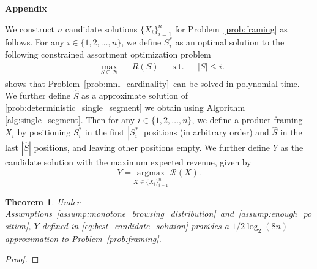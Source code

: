 \documentclass[msom,non-blindrev]{informs3} %
\newtheorem{theorem}{Theorem}
\theoremstyle{definition}
\begin{document}
\begin{appendices}{\Large \noindent\textbf{Appendix}}
{We construct $n$ candidate solutions $\{X_i\}_{i=1}^n$ for Problem~\eqref{prob:framing} as follows. For any $i\in\{1,2,\dots,n\}$, we define $S_i^*$ as an optimal solution to the following constrained assortment optimization problem
\begin{equation}
\label{prob:mnl_cardinality}
\begin{aligned}
&\max_{S\subseteq\mathcal{N}}&&R(S)&&\text{s.t.}&& |S|\leq i.
\end{aligned}
\end{equation}
\cite{rusmevichientong2010dynamic} shows that Problem~\eqref{prob:mnl_cardinality}~can be solved in polynomial time. We further define $\hat{S}$ as a approximate solution of \eqref{prob:deterministic_single_segment} we obtain using Algorithm \ref{alg:single_segment}. Then for any $i\in\{1,2,\dots,n\}$, we define a product framing $X_i$ by positioning $S_i^*$ in the first $|S_i^*|$ positions (in arbitrary order) and $\hat{S}$ in the last $|\hat{S}|$ positions, and leaving other positions empty. We further define $Y$ as the candidate solution with the maximum expected revenue, given by
\begin{equation}\label{eq:best_candidate_solution}
Y=\underset{X\in\{X_i\}_{i=1}^n}{\mathrm{argmax}}\,\mathcal{R}(X).
\end{equation}

\begin{theorem}
Under Assumptions~\ref{assump:monotone_browsing_distribution}~and~\ref{assump:enough_position}, $Y$ defined in \eqref{eq:best_candidate_solution} provides a $1/2\log_2(8n)$-approximation to Problem~\eqref{prob:framing}.
\end{theorem}

\begin{proof}


\end{proof}}
\end{appendices}
\end{document}
